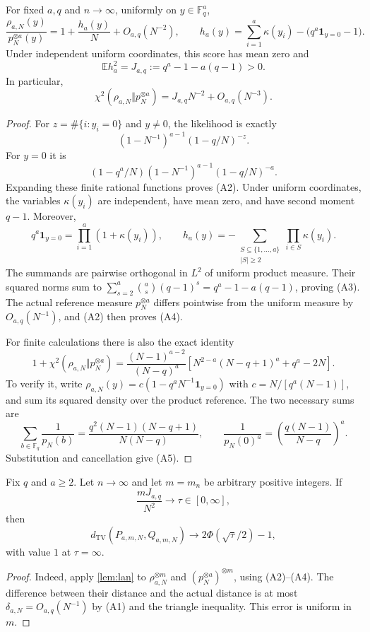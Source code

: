 \begin{lemma}\label{lem:anchor-info}
For fixed $a,q$ and $n\to\infty$, uniformly on $y\in\mathbb F_q^a$,
\[
 \frac{\rho_{a,N}(y)}{p_N^{\otimes a}(y)}
 =1+\frac{h_a(y)}N+O_{a,q}(N^{-2}),
 \qquad
 h_a(y)=\sum_{i=1}^a\kappa(y_i)-\bigl(q^a\mathbf1_{y=0}-1\bigr).
\tag{A2}
\]
Under independent uniform coordinates, this score has mean zero and
\[
 \mathbb E h_a^2=J_{a,q}:=q^a-1-a(q-1)>0.
\tag{A3}
\]
In particular,
\[
 \chi^2(\rho_{a,N}\Vert p_N^{\otimes a})
 =J_{a,q}N^{-2}+O_{a,q}(N^{-3}).
\tag{A4}
\]

\end{lemma}
\begin{proof}
For $z=\#\{i:y_i=0\}$ and $y\ne0$, the likelihood is exactly
\[
 (1-N^{-1})^{a-1}(1-q/N)^{-z}.
\]
For $y=0$ it is
\[
 (1-q^a/N)(1-N^{-1})^{a-1}(1-q/N)^{-a}.
\]
Expanding these finite rational functions proves (A2).
Under uniform coordinates, the variables $\kappa(y_i)$ are independent,
have mean zero, and have second moment $q-1$. Moreover,
\[
 q^a\mathbf1_{y=0}=\prod_{i=1}^a(1+\kappa(y_i)),
 \qquad
 h_a(y)=-\sum_{\substack{S\subseteq\{1,\ldots,a\}\\|S|\ge2}}
               \prod_{i\in S}\kappa(y_i).
\]
The summands are pairwise orthogonal in $L^2$ of uniform product measure.
Their squared norms sum to
$\sum_{s=2}^a\binom as(q-1)^s=q^a-1-a(q-1)$, proving (A3).
The actual reference measure $p_N^{\otimes a}$ differs pointwise from the
uniform measure by $O_{a,q}(N^{-1})$, and (A2) then proves (A4).

For finite calculations there is also the exact identity
\[
 1+\chi^2(\rho_{a,N}\Vert p_N^{\otimes a})
 =\frac{(N-1)^{a-2}}{(N-q)^a}
   \left[N^{2-a}(N-q+1)^a+q^a-2N\right].
\tag{A5}
\]
To verify it, write
$\rho_{a,N}(y)=c(1-q^aN^{-1}\mathbf1_{y=0})$ with
$c=N/[q^a(N-1)]$, and sum its squared density over the product reference.
The two necessary sums are
\[
 \sum_{b\in\mathbb F_q}\frac1{p_N(b)}
 =\frac{q^2(N-1)(N-q+1)}{N(N-q)},\qquad
 \frac1{p_N(0)^a}=\left(\frac{q(N-1)}{N-q}\right)^a.
\]
Substitution and cancellation give (A5).
\end{proof}

\begin{theorem}\label{thm:anchors}
Fix $q$ and $a\ge2$. Let $n\to\infty$ and let $m=m_n$ be arbitrary
positive integers. If
\[
 \frac{mJ_{a,q}}{N^2}\longrightarrow\tau\in[0,\infty],
\]
then
\[
 d_{\mathrm{TV}}(P_{a,m,N},Q_{a,m,N})
 \longrightarrow 2\Phi(\sqrt\tau/2)-1,
\tag{A6}
\]
with value $1$ at $\tau=\infty$.
\end{theorem}
\begin{proof}
Indeed, apply \cref{lem:lan} to
$\rho_{a,N}^{\otimes m}$ and $(p_N^{\otimes a})^{\otimes m}$, using
(A2)--(A4). The difference between their distance and the actual distance
is at most $\delta_{a,N}=O_{a,q}(N^{-1})$ by (A1) and the triangle
inequality. This error is uniform in $m$.
\end{proof}

